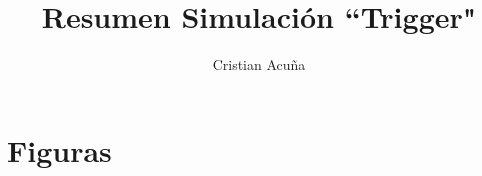 \documentclass[a4paper,10pt]{article}
\author{Cristian Acuña}
\title{Resumen Simulación ``Trigger"}
\begin{document}
\maketitle



\section{Figuras}



\end{document}
